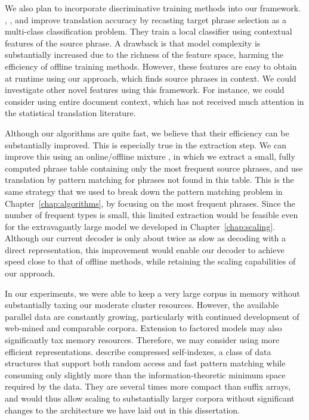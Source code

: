 We also plan to incorporate discriminative training methods into
our framework.  \citet{Chan:2007:acl}, \citet{Carpuat:2007:emnlp-conll},
and \citet{Subotin:2008:generals} improve
translation accuracy by recasting target phrase selection as a
multi-class classification problem.  They train a local 
classifier using contextual features of the source phrase.  A drawback
is that model complexity is substantially increased due to the richness
of the feature space, harming the efficiency of offline training
methods.  However, these features are easy to obtain at runtime 
using our approach, which finds source phrases in context.  We could investigate other novel features using this framework.  For instance, we could consider using entire document context, which has not received much attention in the statistical translation literature.

Although our algorithms are quite fast, we believe that
their efficiency can be substantially improved.  This is especially
true in the extraction step.  We can improve this using
an online/offline mixture \citep{Zhang:2005:eamt}, in which we extract
a small, fully computed phrase table containing only the most frequent
source phrases, and use translation by pattern matching for phrases 
not found in this table.  This is the same strategy that we used to 
break down the pattern matching problem in Chapter~\ref{chap:algorithms},
by focusing on the most frequent phrases.  Since the number
of frequent types is small, this limited extraction would be feasible even
for the extravagantly large model we developed in Chapter~\ref{chap:scaling}.
Although our current decoder is only about twice as slow as decoding
with a direct representation, this improvement 
would enable our decoder to achieve speed close to that of offline
methods, while retaining the scaling capabilities of our approach.

In our experiments, we were able to keep a very large corpus in 
memory without substantially taxing our moderate cluster resources.
However, the available parallel data are constantly growing, 
particularly with continued development of web-mined and comparable corpora.
Extension to factored models may also significantly tax memory resources.
Therefore, we may consider using more efficient representations.
\citet{Navarro:2007:csur} describe compressed self-indexes, 
a class of data structures that support both random access and 
fast pattern matching while consuming only slightly more than
the information-theoretic minimum space required by the data.  
They are several times more compact than suffix arrays, and would 
thus allow scaling to substantially larger corpora without significant
changes to the architecture we have laid out in this dissertation.

